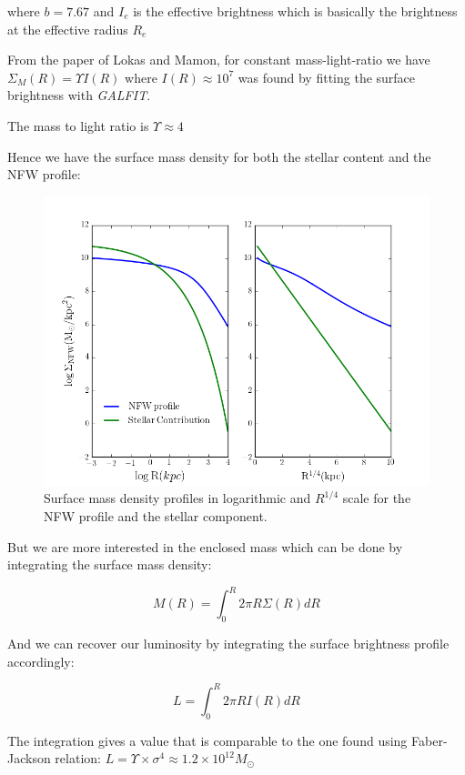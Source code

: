 where $b=7.67$ and $I_{e}$ is the effective brightness which is basically the brightness at the effective radius $R_{e}$

From the paper of Lokas and Mamon, for constant mass-light-ratio we have $\Sigma_{M}(R)= \Upsilon I(R)$ where $I(R)\approx 10^{7}$ was found by fitting the surface brightness with \textit{GALFIT}.

The mass to light ratio is $\Upsilon\approx 4$

Hence we have the surface mass density for both the stellar content and the NFW profile:

\begin{figure}[H]
\centering
\includegraphics[width=12cm]{images/Surface_mass_density_log.png}
\caption[Surface mass density profiles]{Surface mass density profiles in logarithmic and $R^{1/4}$ scale for the NFW profile and the stellar component.}
\end{figure}

But we are more interested in the enclosed mass which can be done by integrating the surface mass density:

\begin{equation}
M(R)=\int_{0}^{R}2\pi R\Sigma(R)dR
\end{equation}

And we can recover our luminosity by integrating the surface brightness profile accordingly:

\begin{equation}
L=\int_{0}^{R}2\pi RI(R)dR
\end{equation}

The integration gives a value that is comparable to the one found using Faber-Jackson relation: $L=\Upsilon\times\sigma^{4}\approx 1.2\times 10^{12}M_{\odot}$


